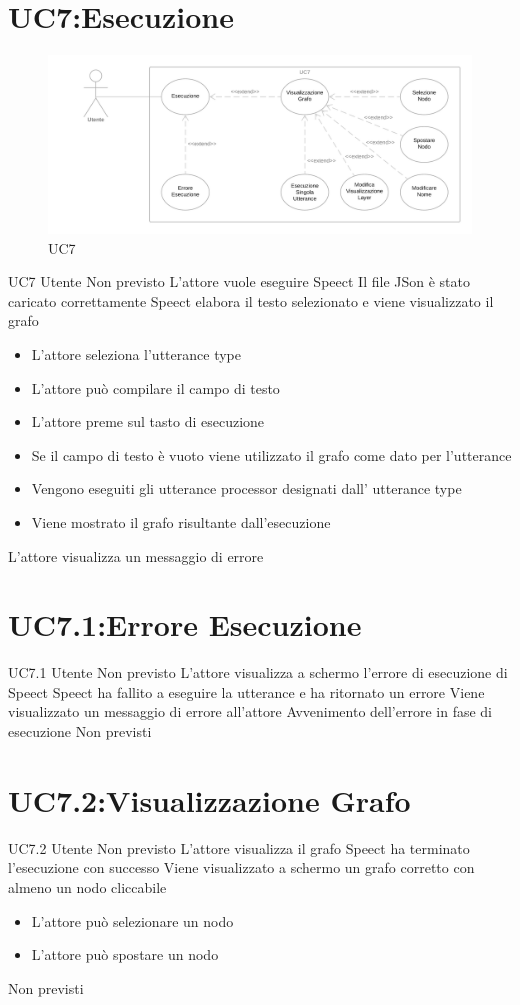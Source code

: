\documentclass[../AnalisideiRequisiti.tex]{subfiles}
\begin{document}
\section{UC7:Esecuzione}
\begin{figure}[H]
	\caption{UC7}
	\centering
	\includegraphics[width=\textwidth]{../img/UC07.png}
\end{figure}
\UserCase
{UC7}
{Utente}
{Non previsto}
{L'attore vuole eseguire Speect}
{Il file JSon è stato caricato correttamente}
{Speect elabora il testo selezionato e viene visualizzato il grafo}
{\begin{itemize}
		\item{} L'attore seleziona l'utterance type
		\item{} L'attore può compilare il campo di testo
		\item{} L'attore preme sul tasto di esecuzione
		\item{} Se il campo di testo è vuoto viene utilizzato il grafo come dato per l'utterance
		\item{} Vengono eseguiti gli utterance processor designati dall' utterance type
		\item{} Viene mostrato il grafo risultante dall'esecuzione 
	\end{itemize}
}
{L'attore visualizza un messaggio di errore }

\section{UC7.1:Errore Esecuzione}
\UserCase
{UC7.1}
{Utente}
{Non previsto}
{L'attore visualizza a schermo l'errore di esecuzione di Speect }
{Speect ha fallito a eseguire la utterance e ha ritornato un errore}
{Viene visualizzato un messaggio di errore all'attore}
{Avvenimento dell'errore in fase di esecuzione}
{Non previsti}
\section{UC7.2:Visualizzazione Grafo}
\UserCase
{UC7.2}
{Utente}
{Non previsto}
{L'attore visualizza il grafo}
{Speect ha terminato l'esecuzione con successo}
{Viene visualizzato a schermo un grafo corretto con almeno un nodo cliccabile}
{
	\begin{itemize}
		\item{} L'attore può selezionare un nodo 
		\item{} L'attore può spostare un nodo 
	\end{itemize}
}
{Non previsti}
\end{document}
